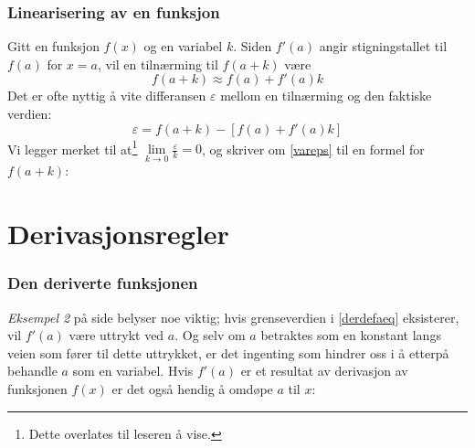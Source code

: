 \subsubsection{Linearisering av en funksjon}
Gitt en funksjon $ f(x) $ og en variabel $ k $. Siden $ f'(a) $ angir stigningstallet til $ f(a) $ for $ x=a $, vil en tilnærming til $ f(a+k) $ være
\[ f(a+k)\approx f(a)+f'(a)k \]
Det er ofte nyttig å vite differansen $ \varepsilon $ mellom en tilnærming og den faktiske verdien:
\begin{equation}\label{vareps}
	\varepsilon = f(a+k)-\left[f(a)+f'(a)k\right]
\end{equation}
Vi legger merket til at\footnote{Dette overlates til leseren å vise.} $ \lim\limits_{k\to0}\frac{\varepsilon}{k} =0 $, og skriver om \eqref{vareps} til en formel for $ f(a+k) $: \regv
{}

\section{Derivasjonsregler}
\subsubsection{Den deriverte funksjonen}
\textsl{Eksempel 2} på side \pageref{dereks2} belyser noe viktig; hvis grenseverdien i \eqref{derdefaeq} eksisterer, vil $ f'(a) $ være uttrykt ved $ a $. Og selv om $ a $ betraktes som en konstant langs veien som fører til dette uttrykket, er det ingenting som hindrer oss i å etterpå behandle $ a $ som en variabel. Hvis $ f'(a) $ er et resultat av derivasjon av funksjonen $ f(x) $ er det også hendig å omdøpe $ a $ til $ x $:\regv
{}
 \regv

